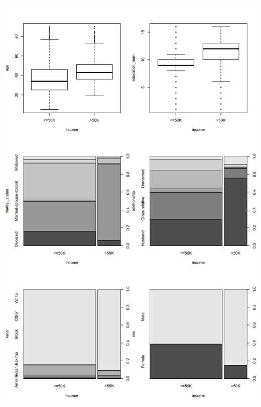 \documentclass{article}\usepackage[]{graphicx}\usepackage[]{color}
\makeatletter
\def\maxwidth{ %
  \ifdim\Gin@nat@width>\linewidth
    \linewidth
  \else
    \Gin@nat@width
  \fi
}
\newenvironment{knitrout}{}{} %
\makeatother
\begin{document}
\begin{knitrout}
\color{fgcolor}
\includegraphics[width=\maxwidth]{figure/generalanalysis-1} 

\end{knitrout}
\end{document}
